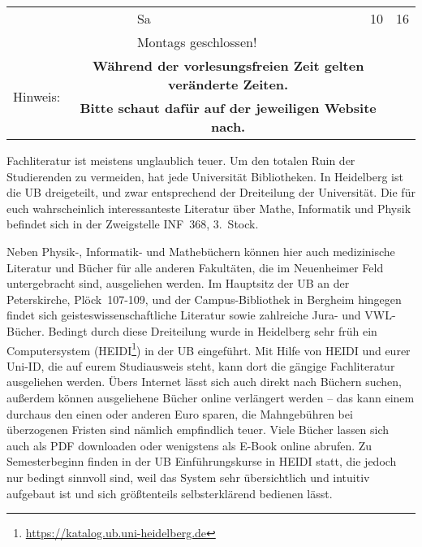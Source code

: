 \begin{table*}
\begin{tabular}{lll@{ -- }l@{\quad}r@{ -- }l@{ Uhr}}
                                             &                                                                                          & \multicolumn{2}{l}{Sa}                           & 10           & 16                                                                              \\
                                             &                                                                                          & \multicolumn{4}{l}{Montags geschlossen!}                                                                                                          \\
        \cmidrule{1-6}
        \multirow{2}{*}{Hinweis:}            & \multicolumn{4}{c}{\textbf{Während der vorlesungsfreien Zeit gelten veränderte Zeiten.}}                                                                                                                                                     \\
                                             & \multicolumn{4}{c}{\textbf{Bitte schaut dafür auf der jeweiligen Website nach.}}                                                                                                                                                             \\
        \bottomrule
    \end{tabular}

\end{table*}

Fachliteratur ist meistens unglaublich teuer. Um den totalen Ruin der Studierenden zu vermeiden, hat jede Universität Bibliotheken. In Heidelberg ist die \gls{UB} dreigeteilt, und zwar entsprechend der Dreiteilung der Universität. Die für euch wahrscheinlich interessanteste Literatur über Mathe, Informatik und Physik befindet sich in der Zweigstelle \gls{INF}~368, 3.~Stock.


Neben Physik-, Informatik- und Mathebüchern können hier auch medizinische Literatur und Bücher für alle anderen Fakultäten, die im Neuenheimer Feld untergebracht sind, ausgeliehen werden. Im Hauptsitz der \gls{UB} an der Peterskirche, Plöck~107-109, und der Campus-Bibliothek in Bergheim hingegen findet sich geisteswissenschaftliche Literatur sowie zahlreiche Jura- und VWL- Bücher. Bedingt durch diese Dreiteilung wurde in Heidelberg sehr früh ein Computersystem (\gls{HEIDI}\footnote{\url{https://katalog.ub.uni-heidelberg.de}}) in der UB eingeführt. Mit Hilfe von HEIDI und eurer Uni-ID, die auf eurem Studiausweis steht, kann dort die gängige Fachliteratur ausgeliehen werden. Übers Internet lässt sich auch direkt nach Büchern suchen, außerdem können ausgeliehene Bücher online verlängert werden -- das kann einem durchaus den einen oder anderen Euro sparen, die Mahngebühren bei überzogenen Fristen sind nämlich empfindlich teuer. Viele Bücher lassen sich auch als PDF downloaden oder wenigstens als E-Book online abrufen. Zu Semesterbeginn finden in der UB Einführungskurse in HEIDI statt, die jedoch nur bedingt sinnvoll sind, weil das System sehr übersichtlich und intuitiv aufgebaut ist und sich größtenteils selbsterklärend bedienen lässt.

